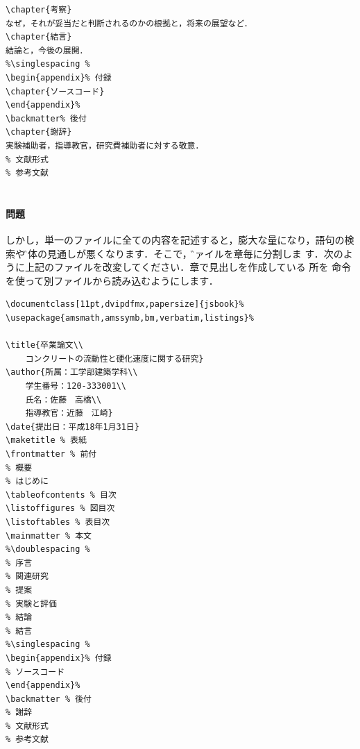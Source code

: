 \begin{verbatim}
\chapter{考察}
なぜ，それが妥当だと判断されるのかの根拠と，将来の展望など．
\chapter{結言}
結論と，今後の展開．
%\singlespacing % 
\begin{appendix}% 付録	
\chapter{ソースコード}
\end{appendix}% 
\backmatter% 後付 
\chapter{謝辞}
実験補助者，指導教官，研究費補助者に対する敬意．
% 文献形式 
% 参考文献 
 
\end{verbatim}

\paragraph{問題}

\widebaselines
しかし，単一のファイルに全ての内容を記述すると，膨大な量になり，語句の検
索や\G{全体の見通し}が悪くなります．そこで，\G{ファイルを章毎に分割}しま
す．次のように上記のファイルを改変してください．章で見出しを作成している
所を  命令を使って別ファイルから読み込むようにします．

\narrowbaselines
\begin{verbatim}
\documentclass[11pt,dvipdfmx,papersize]{jsbook}%
\usepackage{amsmath,amssymb,bm,verbatim,listings}%
 
\title{卒業論文\\
	コンクリートの流動性と硬化速度に関する研究}
\author{所属：工学部建築学科\\
	学生番号：120-333001\\
	氏名：佐藤　高橋\\
	指導教官：近藤　江崎}
\date{提出日：平成18年1月31日}
\maketitle % 表紙
\frontmatter % 前付 
% 概要
% はじめに
\tableofcontents % 目次
\listoffigures % 図目次
\listoftables % 表目次
\mainmatter % 本文 
%\doublespacing %
% 序言
% 関連研究
% 提案
% 実験と評価
% 結論
% 結言
%\singlespacing % 
\begin{appendix}% 付録
% ソースコード
\end{appendix}% 
\backmatter % 後付 
% 謝辞
% 文献形式 
% 参考文献 
 
\end{verbatim}

